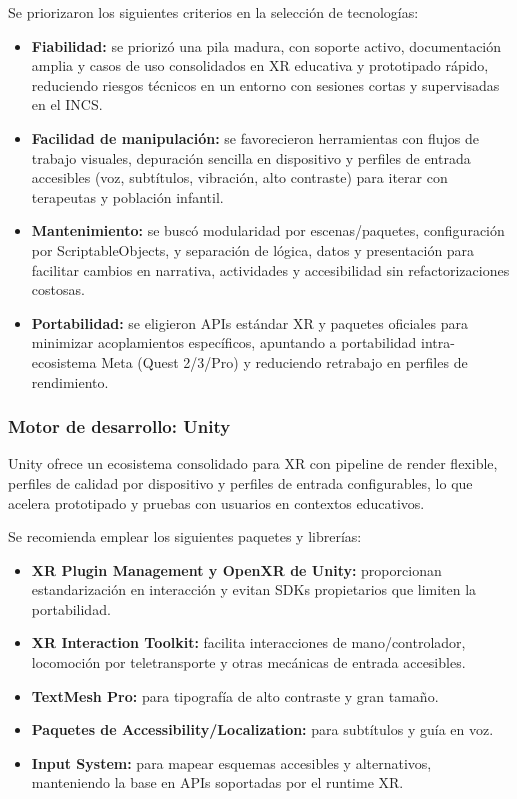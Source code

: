Se priorizaron los siguientes criterios en la selección de tecnologías:

\begin{itemize}
\item \textbf{Fiabilidad:} se priorizó una pila madura, con soporte activo, documentación amplia y casos de uso consolidados en XR educativa y prototipado rápido, reduciendo riesgos técnicos en un entorno con sesiones cortas y supervisadas en el INCS.

\item \textbf{Facilidad de manipulación:} se favorecieron herramientas con flujos de trabajo visuales, depuración sencilla en dispositivo y perfiles de entrada accesibles (voz, subtítulos, vibración, alto contraste) para iterar con terapeutas y población infantil.

\item \textbf{Mantenimiento:} se buscó modularidad por escenas/paquetes, configuración por ScriptableObjects, y separación de lógica, datos y presentación para facilitar cambios en narrativa, actividades y accesibilidad sin refactorizaciones costosas.

\item \textbf{Portabilidad:} se eligieron APIs estándar XR y paquetes oficiales para minimizar acoplamientos específicos, apuntando a portabilidad intra-ecosistema Meta (Quest 2/3/Pro) y reduciendo retrabajo en perfiles de rendimiento.
\end{itemize}

\subsubsection{Motor de desarrollo: Unity}

Unity ofrece un ecosistema consolidado para XR con pipeline de render flexible, perfiles de calidad por dispositivo y perfiles de entrada configurables, lo que acelera prototipado y pruebas con usuarios en contextos educativos.

Se recomienda emplear los siguientes paquetes y librerías:

\begin{itemize}
\item \textbf{XR Plugin Management y OpenXR de Unity:} proporcionan estandarización en interacción y evitan SDKs propietarios que limiten la portabilidad.

\item \textbf{XR Interaction Toolkit:} facilita interacciones de mano/controlador, locomoción por teletransporte y otras mecánicas de entrada accesibles.

\item \textbf{TextMesh Pro:} para tipografía de alto contraste y gran tamaño.

\item \textbf{Paquetes de Accessibility/Localization:} para subtítulos y guía en voz.

\item \textbf{Input System:} para mapear esquemas accesibles y alternativos, manteniendo la base en APIs soportadas por el runtime XR.
\end{itemize}

